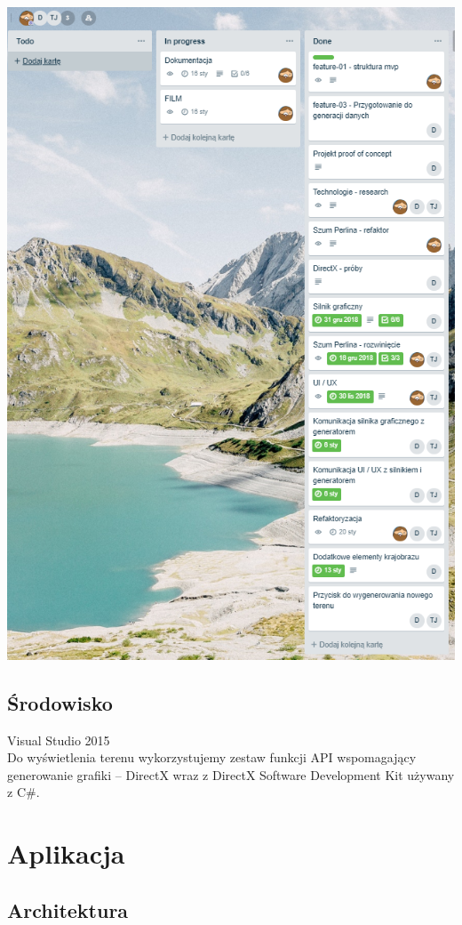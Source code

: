 \documentclass[12pt,a4paper]{article}
\begin{document}
\includegraphics[width=\textwidth, height=0.85\textheight]{Images/kanban.png}
\subsection{Środowisko}
Visual Studio 2015 \\
Do wyświetlenia terenu wykorzystujemy zestaw funkcji API wspomagający generowanie grafiki – DirectX wraz z DirectX Software Development Kit używany z C\#.
\section{Aplikacja}
\subsection{Architektura}
\end{document}
